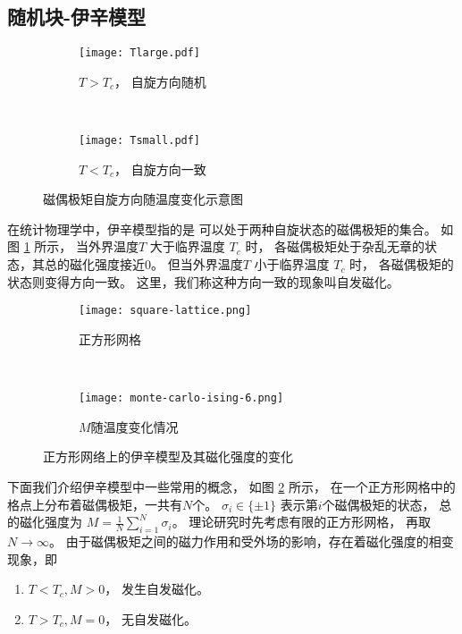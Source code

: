 \subsection{随机块-伊辛模型}\label{sec:ising}
\begin{figure}
	\centering
	\begin{subfigure}{0.5\textwidth}
    \centering
    \texttt{[image: Tlarge.pdf]}
		\caption{$T>T_c$， 自旋方向随机}
	\end{subfigure}~
	\begin{subfigure}{0.5\textwidth}
    \centering
    \texttt{[image: Tsmall.pdf]}
		\caption{$T<T_c$， 自旋方向一致}
	\end{subfigure}
  \caption{磁偶极矩自旋方向随温度变化示意图}\label{fig:ising_two_configurations}
\end{figure}   

在统计物理学中，伊辛模型指的是
可以处于两种自旋状态的磁偶极矩的集合\cite{ising1925beitrag}。
如图 \ref{fig:ising_two_configurations} 所示，
当外界温度$T$
大于临界温度 $T_c$ 时，
各磁偶极矩处于杂乱无章的状态，其总的磁化强度接近0。
但当外界温度$T$
小于临界温度 $T_c$ 时，
各磁偶极矩的状态则变得方向一致。
这里，我们称这种方向一致的现象叫自发磁化。


\begin{figure}
	\centering
	\begin{subfigure}{0.45\textwidth}
		\texttt{[image: square-lattice.png]}
		\caption{正方形网格}\label{fig:square_lattice}
	\end{subfigure}~
	\begin{subfigure}{0.53\textwidth}
		\texttt{[image: monte-carlo-ising-6.png]}
		\caption{$M$随温度变化情况}\label{fig:square_lattice_b}
	\end{subfigure}
  \caption{正方形网络上的伊辛模型及其磁化强度的变化}
\end{figure}

下面我们介绍伊辛模型中一些常用的概念，
如图 \ref{fig:square_lattice} 所示，
在一个正方形网格中的格点上分布着磁偶极矩，一共有$N$个。
$\sigma_i \in \{ \pm 1\} $ 表示第$i$个磁偶极矩的状态，
总的磁化强度为 $M = \frac{1}{N} \sum_{i=1}^N \sigma_i$。
理论研究时先考虑有限的正方形网格， 再取 $N\to \infty$。
由于磁偶极矩之间的磁力作用和受外场的影响，存在着磁化强度的相变现象，即
\begin{enumerate}
		\item $T< T_c, M>0$， 发生自发磁化。
		\item $T> T_c, M=0$， 无自发磁化。
\end{enumerate}

